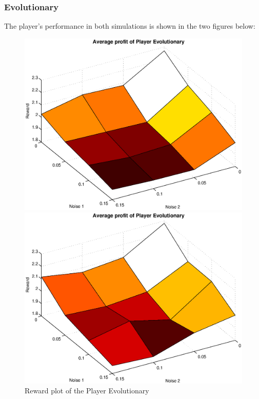 \documentclass[11pt,twoside]{article}
\begin{document}
\subsubsection{Evolutionary}
The player's performance in both simulations is shown in the two figures below:
\begin{figure}[h]

\begin{minipage}[hbt]{0.65\textwidth}
	\centering
	\includegraphics[width=\textwidth]{pics/simulation1/Reward_vs_Noise_of_Player_Evolutionary}
\end{minipage}
\hfill
\begin{minipage}[hbt]{0.3\textwidth}
	\centering
	\includegraphics[width=\textwidth]{pics/simulation2/Reward_vs_Noise_of_Player_Evolutionary}
\end{minipage}
	\caption{Reward plot of the Player Evolutionary}
	\label{pic player evo}
\end{figure}
\end{document}
